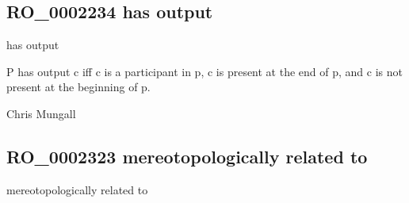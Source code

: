 \documentclass[letterpaper,10pt,english]{sphinxmanual}
\begin{document}
\subsection{RO\_0002234 \sphinxhyphen{} has output}
\label{\detokenize{doc-RO_0002234:ro-0002234-has-output}}\label{\detokenize{doc-RO_0002234:index-0}}\label{\detokenize{doc-RO_0002234::doc}}
\begin{sphinxShadowBox}

\sphinxAtStartPar
has output
\end{sphinxShadowBox}

\begin{sphinxShadowBox}

\sphinxAtStartPar
P has output c iff c is a participant in p, c is present at the end of p, and c is not present at the beginning of p.
\end{sphinxShadowBox}

\begin{sphinxShadowBox}

\sphinxAtStartPar
{}
\end{sphinxShadowBox}

\begin{sphinxShadowBox}

\sphinxAtStartPar
Chris Mungall
\end{sphinxShadowBox}
\begin{quote}

\ignorespaces \end{quote}


\subsection{RO\_0002323 \sphinxhyphen{} mereotopologically related to}
\label{\detokenize{doc-RO_0002323:ro-0002323-mereotopologically-related-to}}\label{\detokenize{doc-RO_0002323:index-0}}\label{\detokenize{doc-RO_0002323::doc}}
\begin{sphinxShadowBox}

\sphinxAtStartPar
mereotopologically related to
\end{sphinxShadowBox}
\end{document}
